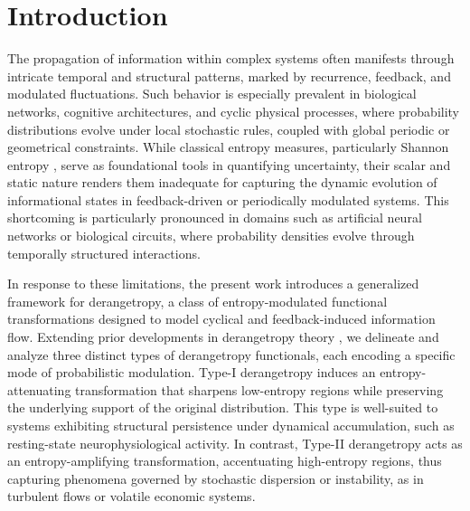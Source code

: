 \documentclass[sn-mathphys-num]{sn-jnl}%
\theoremstyle{thmstyleone}%
\theoremstyle{thmstyletwo}%
\theoremstyle{thmstylethree}%
\begin{document}



\maketitle


\section{Introduction}	
The propagation of information within complex systems often manifests through intricate temporal and structural patterns, marked by recurrence, feedback, and modulated fluctuations. Such behavior is especially prevalent in biological networks, cognitive architectures, and cyclic physical processes, where probability distributions evolve under local stochastic rules, coupled with global periodic or geometrical constraints. While classical entropy measures, particularly Shannon entropy \cite{Shannon1948}, serve as foundational tools in quantifying uncertainty, their scalar and static nature renders them inadequate for capturing the dynamic evolution of informational states in feedback-driven or periodically modulated systems. This shortcoming is particularly pronounced in domains such as artificial neural networks or biological circuits, where probability densities evolve through temporally structured interactions.

In response to these limitations, the present work introduces a generalized framework for derangetropy, a class of entropy-modulated functional transformations designed to model cyclical and feedback-induced information flow. Extending prior developments in derangetropy theory \cite{ataei2024derangetropy}, we delineate and analyze three distinct types of derangetropy functionals, each encoding a specific mode of probabilistic modulation. Type-I derangetropy induces an entropy-attenuating transformation that sharpens low-entropy regions while preserving the underlying support of the original distribution. This type is well-suited to systems exhibiting structural persistence under dynamical accumulation, such as resting-state neurophysiological activity. In contrast, Type-II derangetropy acts as an entropy-amplifying transformation, accentuating high-entropy regions, thus capturing phenomena governed by stochastic dispersion or instability, as in turbulent flows or volatile economic systems.
\end{document}
